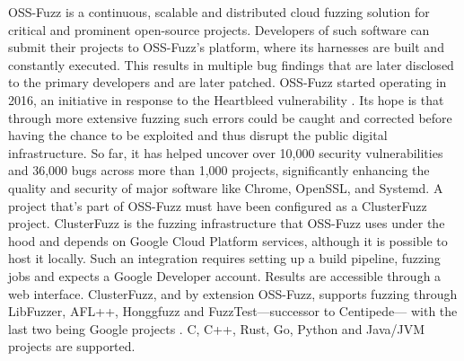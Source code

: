 \documentclass[
  a4paper,
]{scrreprt}
\theoremstyle{definition}
\theoremstyle{remark}
\begin{document}
OSS-Fuzz \autocite{ossfuzzdocs2025,oss-fuzz} is a continuous, scalable
and distributed cloud fuzzing solution for critical and prominent
open-source projects. Developers of such software can submit their
projects to OSS-Fuzz's platform, where its harnesses are built and
constantly executed. This results in multiple bug findings that are
later disclosed to the primary developers and are later patched.
OSS-Fuzz started operating in 2016, an initiative in response to the
Heartbleed vulnerability
\autocite{heartbleed-cve,wheeler2014,heartbleed}. Its hope is that
through more extensive fuzzing such errors could be caught and corrected
before having the chance to be exploited and thus disrupt the public
digital infrastructure. So far, it has helped uncover over 10,000
security vulnerabilities and 36,000 bugs across more than 1,000
projects, significantly enhancing the quality and security of major
software like Chrome, OpenSSL, and Systemd. A project that's part of
OSS-Fuzz must have been configured as a ClusterFuzz
\autocite{clusterfuzz} project. ClusterFuzz is the fuzzing
infrastructure that OSS-Fuzz uses under the hood and depends on Google
Cloud Platform services, although it is possible to host it locally.
Such an integration requires setting up a build pipeline, fuzzing jobs
and expects a Google Developer account. Results are accessible through a
web interface. ClusterFuzz, and by extension OSS-Fuzz, supports fuzzing
through LibFuzzer, AFL++, Honggfuzz and FuzzTest---successor to
Centipede--- with the last two being Google projects
\autocite{libfuzzer,fuzztest,honggfuzz,aflpp}. C, C++, Rust, Go, Python
and Java/JVM projects are supported.
\end{document}
